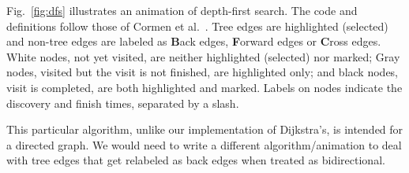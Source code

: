 

Fig.~\ref{fig:dfs} illustrates an animation of depth-first search.
The code and definitions follow those of Cormen et al.~\cite{2009-Intro_to_Algorithms-Cormen}.
Tree edges are highlighted (selected)
and non-tree edges are labeled as \textbf{B}ack edges,
\textbf{F}orward edges or \textbf{C}ross edges.
White nodes, not yet visited,
are neither highlighted (selected) nor marked;
Gray nodes, visited but the visit is not finished, are highlighted only;
and black nodes, visit is completed, are both highlighted and 
marked.
Labels on nodes indicate the discovery and finish times, separated by a slash.

This particular algorithm, unlike our implementation of Dijkstra's,
is intended for a directed graph.
We would
need to write a different algorithm/animation
to deal with tree
edges that get relabeled as back edges when treated as bidirectional.
